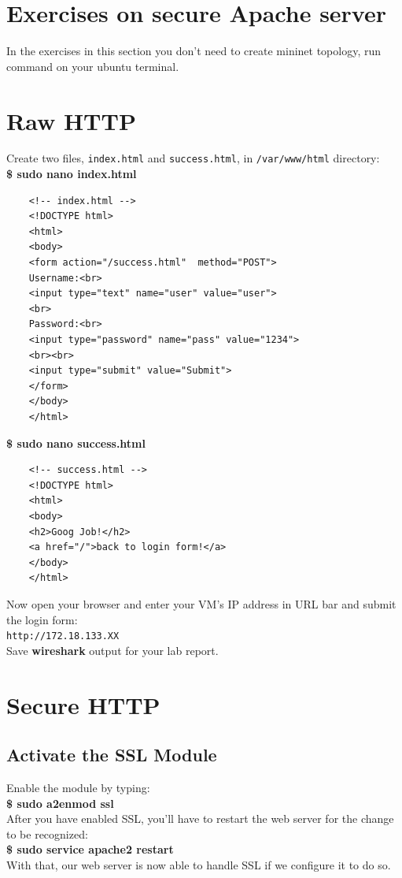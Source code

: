 \documentclass[10pt,a4paper]{article}
\numberwithin{equation}{section}
\numberwithin{figure}{section}
\numberwithin{table}{section}
\begin{document}
	\pagebreak
	
	\section*{Exercises on secure Apache server}
	In the exercises in this section you don't need to create mininet topology, run command on your ubuntu terminal.
	\section{Raw HTTP}
	Create two files, \texttt{index.html} and \texttt{success.html}, in \texttt{/var/www/html} directory: \\
	\textbf{\$ sudo nano index.html}
	\begin{verbatim}
	<!-- index.html --> 
	<!DOCTYPE html>
	<html>
	<body>
	<form action="/success.html"  method="POST">
	Username:<br>
	<input type="text" name="user" value="user">
	<br>
	Password:<br>
	<input type="password" name="pass" value="1234">
	<br><br>
	<input type="submit" value="Submit">
	</form>
	</body>
	</html>
	\end{verbatim}
	\textbf{\$ sudo nano success.html}
	\begin{verbatim}
	<!-- success.html --> 
	<!DOCTYPE html>
	<html>
	<body>
	<h2>Goog Job!</h2>
	<a href="/">back to login form!</a>
	</body>
	</html>
	\end{verbatim}
	
	Now open your browser and enter your VM's IP address in URL bar and submit the login form:\\
	\texttt{http://172.18.133.XX} \\
	Save \textbf{wireshark} output for your lab report.
	\section{Secure HTTP}
	\subsection{Activate the SSL Module}
	Enable the module by typing: \\
	\textbf{\$ sudo a2enmod ssl} \\
	After you have enabled SSL, you'll have to restart the web server for the change to be recognized: \\
	\textbf{\$ sudo service apache2 restart} \\
	With that, our web server is now able to handle SSL if we configure it to do so. \\
\end{document}
